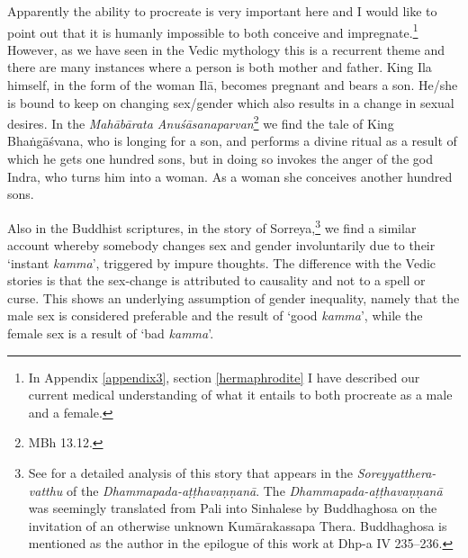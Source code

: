 Apparently the ability to procreate is very important here and I would like to point out that it is humanly impossible to both conceive and impregnate.\footnote{In Appendix \ref{appendix3}, section \ref{hermaphrodite} I have described our current medical understanding of what it entails to both procreate as a male and a female.} However, as we have seen in the Vedic mythology this is a recurrent theme and there are many instances where a person is both mother and father. King Ila himself, in the form of the woman Ilā, becomes pregnant and bears a son. He/she is bound to keep on changing sex/gender which also results in a change in sexual desires. In the {\em Mahābārata Anuśāsanaparvan}\footnote{MBh 13.12.} we find the tale of King Bhaṅgāśvana, who is longing for a son, and performs a divine ritual as a result of which he gets one hundred sons, but in doing so invokes the anger of the god Indra, who turns him into a woman. As a woman she conceives another hundred sons. 

Also in the Buddhist scriptures, in the story of Sorreya,\footnote{See \cite{dhammadinna} for a detailed analysis of this story that appears in the {\em Soreyyatthera-vatthu} of the {\em Dhammapada-aṭṭhavaṇṇanā}. The {\em Dhammapada-aṭṭhavaṇṇanā} was seemingly translated from Pali into Sinhalese by Buddhaghosa on the invitation of an otherwise unknown Kumārakassapa Thera. Buddhaghosa is mentioned as the author in the epilogue of this work at Dhp-a IV 235–236.} we find a similar account whereby somebody changes sex and gender involuntarily due to their `instant {\em kamma}', triggered by impure thoughts. The difference with the Vedic stories is that the sex-change is attributed to causality and not to a spell or curse. This shows an underlying assumption of gender inequality, namely that the male sex is considered preferable and the result of `good {\em kamma}', while the female sex is a result of `bad {\em kamma}'.

